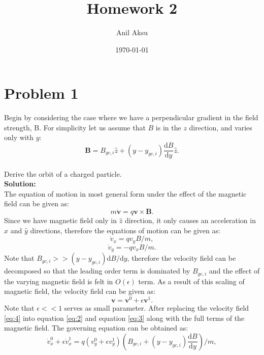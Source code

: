 \documentclass[11pt]{amsart}
\title{Homework 2}
\author{Anil Aksu}
\date{\today}
\begin{document}
\maketitle

\section*{Problem 1 }
Begin by considering the case where we have a perpendicular gradient in the field strength, B. For simplicity let us assume that $B$ is in the $z$ direction, and varies only with $y$: 
\begin{equation*}
\mathbf{B}=B_{gc,i}\hat{z}+(y-y_{gc,i})\frac{\mathrm{d}B}{\mathrm{d}y}\hat{z}.
\end{equation*}
\\
Derive the orbit of a charged particle.
\\
\textbf{Solution:}\\
The equation of motion in most general form under the effect of the magnetic field can be given as:
\begin{equation}
\label{eq:1}
m \mathbf{\dot{v}}=q\mathbf{v}\times\mathbf{B}.
\end{equation}
Since we have magnetic field only in $\hat{z}$ direction, it only causes an acceleration in $\hat{x}$ and $\hat{y}$ directions, therefore the equations of motion can be given as:
\begin{equation}
\label{eq:2}
\dot{v}_x=qv_yB/m,
\end{equation}
\begin{equation}
\label{eq:3}
\dot{v}_y=-qv_xB/m.
\end{equation}
Note that $B_{gc,i}>>(y-y_{gc,i})\mathrm{d}B/ \mathrm{d}y$, therefore the velocity field can be decomposed so that the leading order term is dominated by $B_{gc,i}$ and the effect of the varying magnetic field is felt in $O(\epsilon)$ term. As a result of this scaling of magnetic field, the velocity field can be given as:
\begin{equation}
\label{eq:4}
\mathbf{v}=\mathbf{v}^0 + \epsilon \mathbf{v}^1.
\end{equation}
Note that $\epsilon<<1$ serves as small parameter. After replacing the velocity field \ref{eq:4} into equation \ref{eq:2} and equation \ref{eq:3} along with the full terms of the magnetic field. The governing equation can be obtained as:
\begin{equation}
\label{eq:5}
\dot{v}_{x}^{0}+\epsilon\dot{v}_{x}^{1}=q(v_{y}^{0}+\epsilon v_{y}^{1})(B_{gc,i}+(y-y_{gc,i})\frac{\mathrm{d}B}{\mathrm{d}y})/m,
\end{equation}
\end{document}
